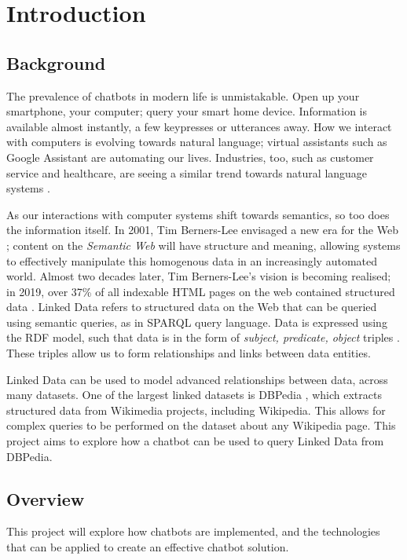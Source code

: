 \chapter{Introduction}
\label{ch:intro}
\section{Background}
The prevalence of chatbots in modern life is unmistakable. Open up your smartphone, your computer; query your smart home device. Information is available almost instantly, a few keypresses or utterances away. How we interact with computers is evolving towards natural language; virtual assistants such as Google Assistant are automating our lives. Industries, too, such as customer service and healthcare, are seeing a similar trend towards natural language systems \cite{gvr2017}.

As our interactions with computer systems shift towards semantics, so too does the information itself. In 2001, Tim Berners-Lee envisaged a new era for the Web \cite{berners2001semantic}; content on the {\it Semantic Web} will have structure and meaning, allowing systems to effectively manipulate this homogenous data in an increasingly automated world. Almost two decades later, Tim Berners-Lee's vision is becoming realised; in 2019, over 37\% of all indexable HTML pages on the web contained structured data \cite{wdc2019crawl}. Linked Data refers to structured data on the Web that can be queried using semantic queries, as in SPARQL query language. Data is expressed using the RDF model, such that data is in the form of {\it subject, predicate, object} triples \cite{bizer2011linked}. These triples allow us to form relationships and links between data entities.

Linked Data can be used to model advanced relationships between data, across many datasets. One of the largest linked datasets is DBPedia \cite{dbpedia2019about}, which extracts structured data from Wikimedia projects, including Wikipedia. This allows for complex queries to be performed on the dataset about any Wikipedia page. This project aims to explore how a chatbot can be used to query Linked Data from DBPedia. 

\section{Overview}
This project will explore how chatbots are implemented, and the technologies that can be applied to create an effective chatbot solution.

